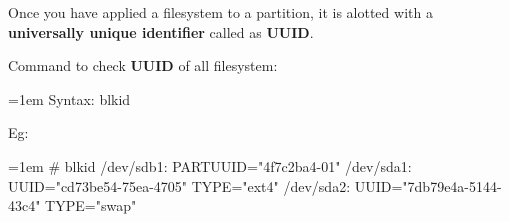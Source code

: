 \begin{flushleft}
Once you have applied a filesystem to a partition, it is alotted with a \textbf{universally unique identifier} called as \textbf{UUID}. 

\newline
Command to check \textbf{UUID} of all filesystem:

\bigskip
\begin{tcolorbox}[breakable,notitle,boxrule=-0pt,colback=pink,colframe=pink]
	\color{black}
	\font=1em
	Syntax: blkid
	\font=4pt
\end{tcolorbox}

Eg:
\begin{tcolorbox}[breakable,notitle,boxrule=-0pt,colback=black,colframe=black]
	\color{green}
	\font=1em
	\# blkid
	\newline
	\color{white}
	/dev/sdb1: PARTUUID="4f7c2ba4-01"
	\newline
	/dev/sda1: UUID="cd73be54-75ea-4705" TYPE="ext4"
	\newline
	/dev/sda2: UUID="7db79e4a-5144-43c4" TYPE="swap"
	\font=4pt
\end{tcolorbox}

\end{flushleft}
\newpage

